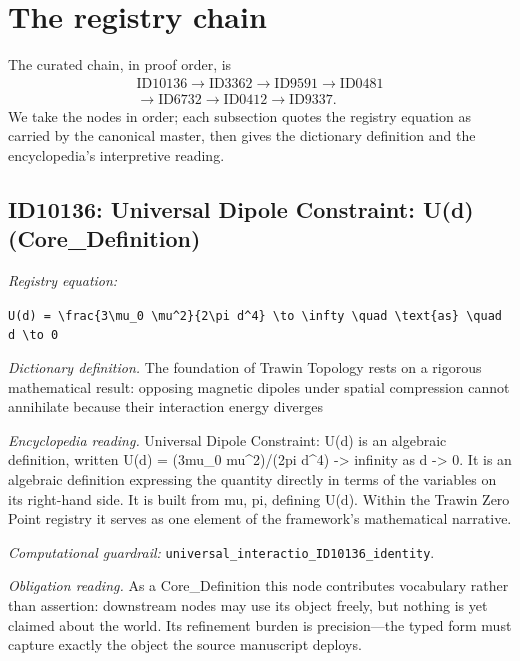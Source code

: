 \documentclass[11pt]{article}
\theoremstyle{remark}
\begin{document}
\section{The registry chain}
\label{sec:chain}

The curated chain, in proof order, is
\begin{equation*}
\begin{gathered}
\text{ID10136} \to \text{ID3362} \to \text{ID9591} \to \text{ID0481} \\
\to \text{ID6732} \to \text{ID0412} \to \text{ID9337}.
\end{gathered}
\end{equation*}
We take the nodes in order; each subsection quotes the registry equation as carried by the canonical master, then gives the dictionary definition and the encyclopedia's interpretive reading.

\subsection{ID10136: Universal Dipole Constraint: U(d) (Core\_Definition)}

\noindent\textit{Registry equation:}\par
{\small\texttt{U(d) = \textbackslash{}frac\{3\textbackslash{}mu\_0 \textbackslash{}mu\textasciicircum{}2\}\{2\textbackslash{}pi d\textasciicircum{}4\} \textbackslash{}to \textbackslash{}infty \textbackslash{}quad \textbackslash{}text\{as\} \textbackslash{}quad d \textbackslash{}to 0}}\par\medskip
\noindent\textit{Dictionary definition.} The foundation of Trawin Topology rests on a rigorous mathematical result: opposing magnetic dipoles under spatial compression cannot annihilate because their interaction energy diverges\par\medskip
\noindent\textit{Encyclopedia reading.} Universal Dipole Constraint: U(d) is an algebraic definition, written U(d) = (3mu\_0 mu\textasciicircum{}2)/(2pi d\textasciicircum{}4) -> infinity as d -> 0. It is an algebraic definition expressing the quantity directly in terms of the variables on its right-hand side. It is built from mu, pi, defining U(d). Within the Trawin Zero Point registry it serves as one element of the framework's mathematical narrative.
\par\medskip\noindent\textit{Computational guardrail:} \texttt{universal\_interactio\_ID10136\_identity}.
\par\medskip\noindent\textit{Obligation reading.} As a Core\_Definition this node contributes vocabulary rather than assertion: downstream nodes may use its object freely, but nothing is yet claimed about the world. Its refinement burden is precision---the typed form must capture exactly the object the source manuscript deploys.
\end{document}
